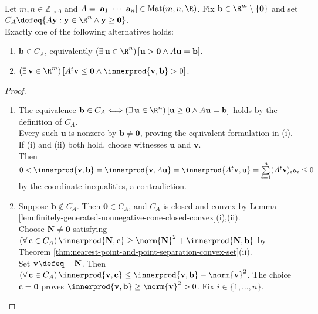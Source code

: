 \begin{theorem} \label{thm:farkas-lemma-strict-positive-system} \\
Let $m,n\in\mathbb{Z}_{>0}$ and $A=[\mathbf{a}_1\ \cdots\ \mathbf{a}_n]\in\operatorname{Mat}(m,n,\R)$. Fix $\mathbf{b}\in\R^m\setminus\{\mathbf{0}\}$ and set $C_A\defeq\{A\mathbf{y}:\mathbf{y}\in\R^n\land\mathbf{y}\geq\mathbf{0}\}$.\\
Exactly one of the following alternatives holds:
\begin{enumerate}[label=(\roman*)]
\setlength{\itemsep}{0pt}
\item $\mathbf{b}\in C_A$, equivalently $(\exists\,\mathbf{u}\in\R^n)\,[\mathbf{u}>\mathbf{0}\land A\mathbf{u}=\mathbf{b}]$.
\item $(\exists\,\mathbf{v}\in\R^m)\,[A^t\mathbf{v}\leq\mathbf{0}\land\innerprod{\mathbf{v},\mathbf{b}}>0]$.
\end{enumerate}
\begin{proof}
\begin{enumerate}[label=(\roman*)]
\setlength{\itemsep}{0pt}
\item The equivalence $\mathbf{b}\in C_A\Longleftrightarrow(\exists\,\mathbf{u}\in\R^n)\,[\mathbf{u}\geq\mathbf{0}\land A\mathbf{u}=\mathbf{b}]$ holds by the definition of $C_A$.\\
Every such $\mathbf{u}$ is nonzero by $\mathbf{b}\neq\mathbf{0}$, proving the equivalent formulation in (i). If (i) and (ii) both hold, choose witnesses $\mathbf{u}$ and $\mathbf{v}$.\\
Then $0<\innerprod{\mathbf{v},\mathbf{b}}=\innerprod{\mathbf{v},A\mathbf{u}}=\innerprod{A^t\mathbf{v},\mathbf{u}}=\sum\limits_{i=1}^{n}(A^t\mathbf{v})_iu_i\leq0$ by the coordinate inequalities, a contradiction.
\item Suppose $\mathbf{b}\notin C_A$. Then $\mathbf{0}\in C_A$, and $C_A$ is closed and convex by Lemma \ref{lem:finitely-generated-nonnegative-cone-closed-convex}(i),(ii).\\
Choose $\mathbf{N}\neq\mathbf{0}$ satisfying $(\forall\,\mathbf{c}\in C_A)\,\innerprod{\mathbf{N},\mathbf{c}}\geq\norm{\mathbf{N}}^2+\innerprod{\mathbf{N},\mathbf{b}}$ by Theorem \ref{thm:nearest-point-and-point-separation-convex-set}(ii).\\
Set $\mathbf{v}\defeq-\mathbf{N}$. Then $(\forall\,\mathbf{c}\in C_A)\,\innerprod{\mathbf{v},\mathbf{c}}\leq\innerprod{\mathbf{v},\mathbf{b}}-\norm{\mathbf{v}}^2$. The choice $\mathbf{c}=\mathbf{0}$ proves $\innerprod{\mathbf{v},\mathbf{b}}\geq\norm{\mathbf{v}}^2>0$. Fix $i\in\{1,\ldots,n\}$.\\

\end{enumerate}
\end{proof}
\end{theorem}
